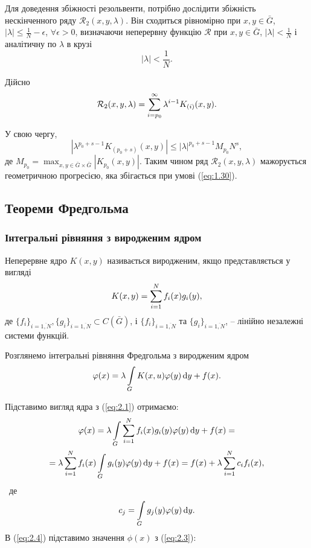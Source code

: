 Для доведення збіжності резольвенти, потрібно дослідити збіжність нескінченного ряду $\mathcal{R}_2(x, y, \lambda)$. Він сходиться рівномірно при $x, y \in \bar G$, $|\lambda| \le \frac{1}{N} - \epsilon$, $\forall \epsilon > 0$, визначаючи неперервну функцію $\mathcal{R}$ при $x, y \in \bar G$, $|\lambda| < \frac{1}{N}$ і аналітичну по $\lambda$ в крузі 
\begin{equation}
	\label{eq:1.30}
	|\lambda| < \dfrac{1}{N}.
\end{equation}

Дійсно \[\mathcal{R}_2(x, y, \lambda) = \displaystyle\sum\limits_{i = p_0}^\infty \lambda^{i - 1} K_{(i)}(x, y).\]

У свою чергу, \[|\lambda^{p_0 + s - 1} K_{(p_0 + s)}(x, y)| \le |\lambda|^{p_0 + s - 1} M_{p_0} N^s,\] де $M_{p_0} = \max_{x, y \in \bar G \times \bar G} |K_{p_0}(x, y)|$. Таким чином ряд $\mathcal{R}_2(x, y, \lambda)$ мажорується геометричною прогресією, яка збігається при умові (\ref{eq:1.30}).

\subsection{Теореми Фредгольма}
\subsubsection{Інтегральні рівняння з виродженим ядром}

\begin{definition*}
	Неперервне ядро $K(x, y)$ називається виродженим, якщо представляється у вигляді
	\begin{equation}
		\label{eq:2.1}
		K(x, y) = \displaystyle\sum\limits_{i = 1}^N f_i(x) g_i(y),
	\end{equation}
	де $\{ f_i \}_{i = \overline{1, N}}, \{ g_i \}_{i = \overline{1, N}} \subset C(\bar G)$, і $\{ f_i \}_{i = \overline{1, N}}$ та $\{ g_i \}_{i = \overline{1, N}}$, -- лінійно незалежні системи функцій.
\end{definition*}

Розглянемо інтегральні рівняння Фредгольма з виродженим ядром 
\begin{equation}
	\label{eq:2.2}
	\varphi(x) = \lambda \displaystyle\int\limits_G K(x, u) \varphi(y) \mathop{}\!\mathrm{d} y + f(x).
\end{equation}

Підставимо вигляд ядра з (\ref{eq:2.1}) отримаємо:
\begin{multline}
	\label{eq:2.3}
	\varphi(x) = \lambda \displaystyle\int\limits_G \displaystyle\sum\limits_{i = 1}^N f_i(x) g_i(y) \varphi(y) \mathop{}\!\mathrm{d} y + f(x) = \\
	= \lambda \displaystyle\sum\limits_{i = 1}^N f_i(x) \displaystyle\int\limits_G g_i(y) \varphi(y) \mathop{}\!\mathrm{d} y + f(x) = f(x) + \lambda \displaystyle\sum\limits_{i = 1}^N c_i f_i(x),
\end{multline}\
де 
\begin{equation}
	\label{eq:2.4}
	c_j = \displaystyle\int\limits_G g_j(y) \varphi(y) \mathop{}\!\mathrm{d} y.
\end{equation}
В (\ref{eq:2.4}) підставимо значення $\phi(x)$ з (\ref{eq:2.3}):

